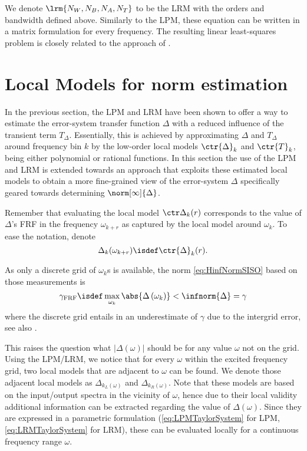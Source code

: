 We denote $\lrm{N_W,N_B,N_A,N_T}$ to be the \gls{LRM} with the orders and bandwidth defined above.
Similarly to the \gls{LPM}, these equation can be written in a matrix formulation for every frequency.
The resulting linear least-squares problem is closely related to the approach of \cite{Levy1959}.

\section{Local Models for \Hinf{} norm estimation}
\label{sec:LPMHinf}
In the previous section, the \gls{LPM} and \gls{LRM} have been shown to offer a way to estimate the error-system transfer function $\Delta$ with a reduced influence of the transient term $T_{\Delta}$. Essentially, this is achieved by approximating $\Delta$ and $T_{\Delta}$ around frequency bin $k$ by the low-order local models $\ctr{\Delta}_{k}$ and $\ctr{T}_{k}$, being either polynomial or rational functions.
In this section the use of the LPM and LRM is extended towards an approach that exploits these estimated local models to obtain a more fine-grained view of the error-system $\Delta$ specifically geared towards determining $\norm[\infty]{\Delta}$.

Remember that evaluating the local model $\ctr\Delta_{k}(r)$ corresponds to the value of $\Delta$'s \gls{FRF} in the frequency $\omega_{k+r}$ as captured by the local model around $\omega_{k}$.
To ease the notation, denote
\begin{equation}
  \Delta_{k}(\omega_{k+r}) \isdef \ctr{\Delta}_{k}(r) \text{.}
\end{equation}

As only a discrete grid of $\omega_k$s is available, the \Hinf{} norm \eqref{eq:HinfNormSISO} based on those measurements is
\begin{equation}
  \gamma_{\mathrm{FRF}} 
    \isdef \max_{\omega_k} \abs{\Delta\left( \omega_k \right)}  
    < \infnorm{\Delta} = \gamma
  \label{eq:gammaFRF}
\end{equation}
where the discrete grid entails in an underestimate of $\gamma$ due to the intergrid error, see also .

This raises the question what $\left|\Delta(\omega)\right|$ should be for any value $\omega$ not on the grid.
Using the \gls{LPM}/\gls{LRM}, we notice that for every $\omega$ within the excited frequency grid, two local models that are adjacent to $\omega$ can be found.
We denote those adjacent local models as $\Delta_{k_L(\omega)}$ and $\Delta_{k_R(\omega)}$.
Note that these models are based on the input/output spectra in the vicinity of $\omega$, hence due to their local validity additional information can be extracted regarding the value of $\Delta(\omega)$.
Since they are expressed in a parametric formulation (\eqref{eq:LPMTaylorSystem} for \gls{LPM}, \eqref{eq:LRMTaylorSystem} for \gls{LRM}), these can be evaluated locally for a continuous frequency range $\omega$.

